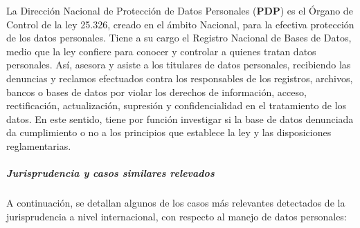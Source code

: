 \begin{enumerate}
        La Dirección Nacional de Protección de Datos Personales (\textbf{PDP}) es el Órgano de Control de la ley 25.326, creado en el ámbito Nacional, para la efectiva protección de los datos personales.
Tiene a su cargo el Registro Nacional de Bases de Datos, medio que la ley confiere para conocer y controlar a quienes tratan datos personales.
Así, asesora y asiste a los titulares de datos personales, recibiendo las denuncias y reclamos efectuados contra los responsables de los registros, archivos, bancos o bases de datos por violar los derechos de información, acceso, rectificación, actualización, supresión y confidencialidad en el tratamiento de los datos.
		En este sentido, tiene por función investigar si la base de datos denunciada da cumplimiento o no a los principios que establece la ley y las disposiciones reglamentarias.
        
	\end{enumerate} 
    
    
\subparagraph{Jurisprudencia y casos similares relevados}
    
    A continuación, se detallan algunos de los casos más relevantes detectados de la jurisprudencia a nivel internacional, con respecto al manejo de datos personales:
    
